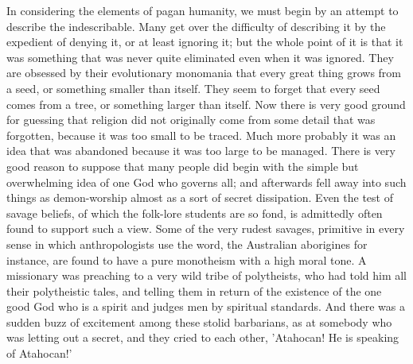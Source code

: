 In considering the elements of pagan humanity, we must begin by an attempt to describe the indescribable. Many get over the difficulty of describing it by the expedient of denying it, or at least ignoring it; but the whole point of it is that it was something that was never quite eliminated even when it was ignored. They are obsessed by their evolutionary monomania that every great thing grows from a seed, or something smaller than itself. They seem to forget that every seed comes from a tree, or something larger than itself. Now there is very good ground for guessing that religion did not originally come from some detail that was forgotten, because it was too small to be traced. Much more probably it was an idea that was abandoned because it was too large to be managed. There is very good reason to suppose that many people did begin with the simple but overwhelming idea of one God who governs all; and afterwards fell away into such things as demon-worship almost as a sort of secret dissipation. Even the test of savage beliefs, of which the folk-lore students are so fond, is admittedly often found to support such a view. Some of the very rudest savages, primitive in every sense in which anthropologists use the word, the Australian aborigines for instance, are found to have a pure monotheism with a high moral tone. A missionary was preaching to a very wild tribe of polytheists, who had told him all their polytheistic tales, and telling them in return of the existence of the one good God who is a spirit and judges men by spiritual standards. And there was a sudden buzz of excitement among these stolid barbarians, as at somebody who was letting out a secret, and they cried to each other, 'Atahocan! He is speaking of Atahocan!'

